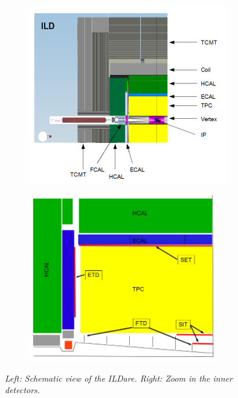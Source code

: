 \begin{figure}
\centering
\begin{subfigure}{0.5\textwidth}
    \includegraphics[width=0.95\textwidth]{graphics/ILD.png}

\end{subfigure}%
  \begin{subfigure}{0.5\textwidth}
\centering
    \includegraphics[width=0.9\textwidth]{graphics/ILDtracking.png}

\end{subfigure}
    \caption{\sl Left: Schematic view of the ILDare. Right: Zoom in the inner detectors.}
    \label{fig:ILDScheme}
\end{figure}

